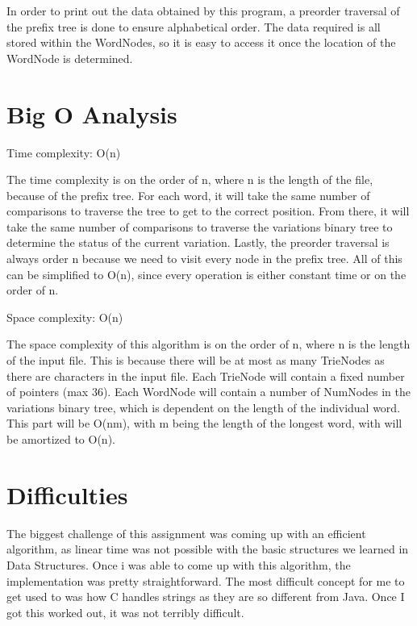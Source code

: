 \documentclass[11pt]{article}
\begin{document}
In order to print out the data obtained by this program, a preorder traversal
of the prefix tree is done to ensure alphabetical order. The data required is 
all stored within the WordNodes, so it is easy to access it once the location 
of the WordNode is determined.

\section*{Big O Analysis}

Time complexity: O(n)

The time complexity is on the order of n, where n is the length of the file,
because of the prefix tree.  For each word, it will take the same number of
comparisons to traverse the tree to get to the correct position. From there, it 
will take the same number of comparisons to traverse the variations binary tree
to determine the status of the current variation. Lastly, the preorder traversal
is always order n because we need to visit every node in the prefix tree. All
of this can be simplified to O(n), since every operation is either constant 
time or on the order of n.

Space complexity: O(n)

The space complexity of this algorithm is on the order of n, where n is the 
length of the input file. This is because there will be at most as many 
TrieNodes as there are characters in the input file. Each TrieNode will 
contain a fixed number of pointers (max 36). Each WordNode will contain
a number of NumNodes in the variations binary tree, which is dependent on the 
length of the individual word. This part will be O(nm), with m being the length
of the longest word, with will be amortized to O(n).

\section*{Difficulties}

The biggest challenge of this assignment was coming up with an efficient
algorithm, as linear time was not possible with the basic structures we learned
in Data Structures. Once i was able to come up with this algorithm, the 
implementation was pretty straightforward. The most difficult concept for me to
get used to was how C handles strings as they are so different from Java. Once
I got this worked out, it was not terribly difficult.
\end{document}
